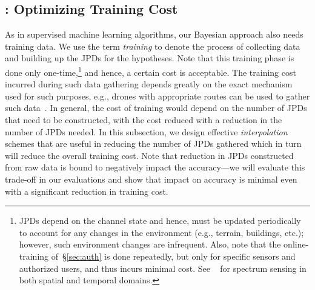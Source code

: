 

\subsection{\ildw: Optimizing Training Cost}
\label{sec:inter}

As in supervised machine learning algorithms, our Bayesian approach
also needs training data.  We use the term
\emph{training} to denote the process of collecting data and building
up the JPDs for the hypotheses. Note that this training phase is done
only one-time,\footnote{JPDs depend on the channel state and
    hence, must be updated periodically to account for any changes in
    the environment (e.g., terrain, buildings, etc.); however, such
    environment changes are infrequent. Also, note that the
    online-training of~\S\ref{sec:auth} is done repeatedly, but only
    for specific sensors and authorized users, and thus incurs minimal
    cost. See ~\cite{mobicom19-bigspec} for spectrum sensing in both spatial and temporal domains. }
and hence, a certain cost is acceptable. The training cost
incurred during such data gathering depends greatly on the exact
mechanism used for such purposes, e.g., drones with appropriate routes
can be used to gather such data~\cite{robot-ref}.  In general, the
cost of training would depend on the number of JPDs that need to be
constructed, with the cost reduced with a reduction in the number of
JPDs needed. In this subsection, we design effective {\em interpolation}
schemes that are useful in reducing the number of JPDs gathered which
in turn will reduce the overall training cost. Note that reduction in
JPDs constructed from raw data is bound to negatively impact the
accuracy---we will evaluate this trade-off in our evaluations and show
that impact on accuracy is minimal even with a significant reduction in
training cost.

